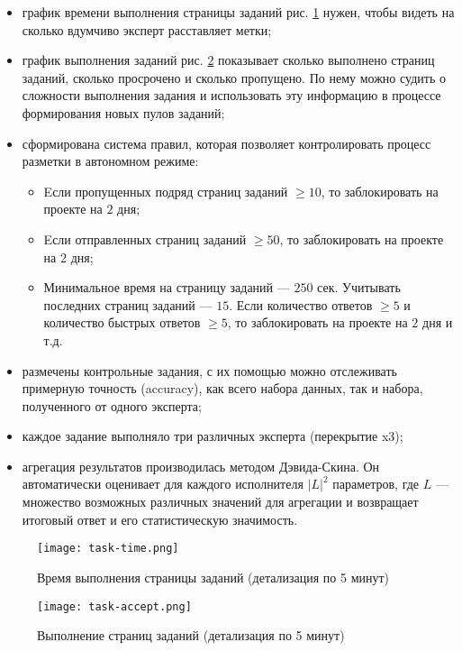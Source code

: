\bigskip
\begin{itemize}
 \item график времени выполнения страницы заданий рис. \ref{fig:task-time} нужен, чтобы видеть на сколько вдумчиво эксперт расставляет метки;
 \item график выполнения заданий рис. \ref{fig:task-accept} показывает сколько выполнено страниц заданий, сколько просрочено и сколько пропущено. По нему можно судить о сложности выполнения задания и использовать эту информацию в процессе формирования новых пулов заданий;
 \item сформирована система правил, которая позволяет контролировать процесс разметки в автономном режиме:
    \medskip
    \begin{itemize}
     \item Eсли пропущенных подряд страниц заданий $\geqslant 10$, то заблокировать на проекте на $2$ дня;
     \item Eсли отправленных страниц заданий $\geqslant 50$, то заблокировать на проекте на $2$ дня;
     \item Минимальное время на страницу заданий --- $250$ сек. Учитывать последних страниц заданий --- $15$. Если количество ответов $\geqslant 5$ и количество быстрых ответов $\geqslant 5$, то заблокировать на проекте на $2$ дня и т.д.
    \end{itemize}
 \item размечены контрольные задания, с их помощью можно отслеживать примерную точность (accuracy), как всего набора данных, так и набора, полученного от одного эксперта;
 \item каждое задание выполняло три различных эксперта (перекрытие x3);
 \item агрегация результатов производилась методом Дэвида-Скина. Он автоматически оценивает для каждого исполнителя $|L|^2$ параметров, где $L$ --- множество возможных различных значений для агрегации и возвращает итоговый ответ и его статистическую значимость.
\end{itemize}


\begin{figure}[ht]
    \centering
    \texttt{[image: task-time.png]}
    \caption{Время выполнения страницы заданий (детализация по 5 минут)}
    \label{fig:task-time}
\end{figure}



\begin{figure}[ht]
    \centering
    \texttt{[image: task-accept.png]}
    \caption{Выполнение страниц заданий (детализация по 5 минут)}
    \label{fig:task-accept}
\end{figure}

